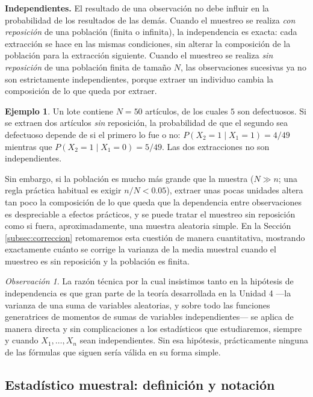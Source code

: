 \documentclass[11pt,a4paper]{article}
\theoremstyle{plain}
\theoremstyle{definition}
\newtheorem{ejemplo}[teorema]{Ejemplo}
\theoremstyle{remark}
\newtheorem{observacion}[teorema]{Observación}
\begin{document}
\textbf{Independientes.} El resultado de una observación no debe influir en la probabilidad de los resultados de las demás. Cuando el muestreo se realiza \emph{con reposición} de una población (finita o infinita), la independencia es exacta: cada extracción se hace en las mismas condiciones, sin alterar la composición de la población para la extracción siguiente. Cuando el muestreo se realiza \emph{sin reposición} de una población finita de tamaño $N$, las observaciones sucesivas ya no son estrictamente independientes, porque extraer un individuo cambia la composición de lo que queda por extraer.

\begin{ejemplo}
Un lote contiene $N=50$ artículos, de los cuales $5$ son defectuosos. Si se extraen dos artículos \emph{sin} reposición, la probabilidad de que el segundo sea defectuoso depende de si el primero lo fue o no: $P(X_2=1\mid X_1=1)=4/49$ mientras que $P(X_2=1\mid X_1=0)=5/49$. Las dos extracciones no son independientes.
\end{ejemplo}

Sin embargo, si la población es mucho más grande que la muestra ($N \gg n$; una regla práctica habitual es exigir $n/N < 0.05$), extraer unas pocas unidades altera tan poco la composición de lo que queda que la dependencia entre observaciones es despreciable a efectos prácticos, y se puede tratar el muestreo sin reposición como si fuera, aproximadamente, una muestra aleatoria simple. En la Sección \ref{subsec:correccion} retomaremos esta cuestión de manera cuantitativa, mostrando exactamente cuánto se corrige la varianza de la media muestral cuando el muestreo es sin reposición y la población es finita.

\begin{observacion}
La razón técnica por la cual insistimos tanto en la hipótesis de independencia es que gran parte de la teoría desarrollada en la Unidad 4 —la varianza de una suma de variables aleatorias, y sobre todo las funciones generatrices de momentos de sumas de variables independientes— se aplica de manera directa y sin complicaciones a los estadísticos que estudiaremos, siempre y cuando $X_1,\dots,X_n$ sean independientes. Sin esa hipótesis, prácticamente ninguna de las fórmulas que siguen sería válida en su forma simple.
\end{observacion}

\subsection{Estadístico muestral: definición y notación}
\end{document}
